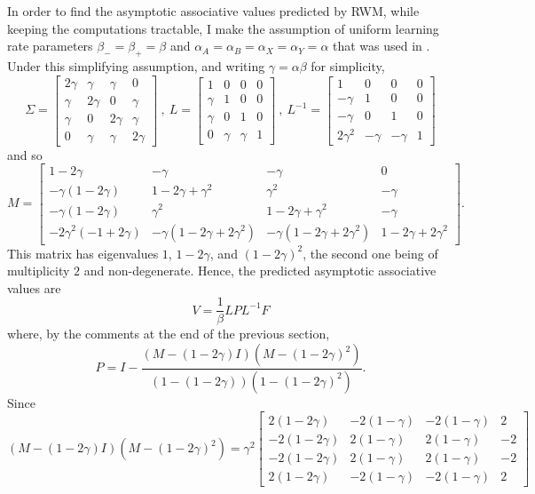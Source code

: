 \documentclass[]{interact}
\theoremstyle{plain}%
\theoremstyle{definition}
\theoremstyle{remark}
\begin{document}
In order to find the asymptotic associative values predicted by RWM, while keeping the computations tractable, I make the assumption of uniform learning rate parameters $\beta_-=\beta_+=\beta$ and $\alpha_A=\alpha_B=\alpha_X=\alpha_Y=\alpha$ that was used in \cite{A24}.
Under this simplifying assumption, and writing $\gamma=\alpha\beta$ for simplicity,
\[
\Sigma=
\begin{bmatrix}
2\gamma & \gamma		& \gamma 			& 0\\
\gamma	& 2\gamma & 0					 & \gamma\\
\gamma	& 0 			& 2\gamma & \gamma\\
0			& \gamma				& \gamma		& 2\gamma
\end{bmatrix} \ , \ 
L=\begin{bmatrix}
1 & 0 & 0 & 0 \\
\gamma& 1 & 0					 & 0\\
\gamma		& 0 			& 1 & 0\\
0			& \gamma				& \gamma			& 1
\end{bmatrix} \ , \
L^{-1}=\begin{bmatrix}
1 & 0 & 0 & 0 \\
-\gamma		& 1 & 0					 & 0\\
-\gamma			& 0 			& 1 & 0\\
2\gamma^2		& -\gamma				& -\gamma			& 1
\end{bmatrix}
\]
and so
\[
M=\begin{bmatrix}
1-2\gamma & -\gamma & - \gamma & 0\\
-\gamma(1-2\gamma) & 1-2\gamma+\gamma^2 & \gamma^2 & -\gamma\\
-\gamma(1-2\gamma) &\gamma^2 & 1-2\gamma+\gamma^2 & - \gamma\\
-2\gamma^2(-1+2\gamma)&-\gamma(1-2\gamma+2\gamma^2)&-\gamma(1-2\gamma+2\gamma^2)&1-2\gamma+2\gamma^2
\end{bmatrix}.
\]
This matrix has eigenvalues $1$, $1-2\gamma$, and $(1-2\gamma)^2$, the second one being of multiplicity $2$ and non-degenerate. Hence, the predicted asymptotic associative values are
\[
V=\frac{1}{\beta}L P L^{-1}F
\]
where, by the comments at the end of the previous section,
\[
P=I-\frac{(M-(1-2\gamma)I)(M-(1-2\gamma)^2)}{(1-(1-2\gamma))(1-(1-2\gamma)^2)}.
\]
Since 
\[
(M-(1-2\gamma)I)(M-(1-2\gamma)^2)=\gamma^2\begin{bmatrix}
2(1-2\gamma)& -2(1-\gamma) & -2(1-\gamma) & 2\\
-2(1-2\gamma)& 2(1-\gamma) & 2(1-\gamma) & -2\\
-2(1-2\gamma)& 2(1-\gamma) & 2(1-\gamma) & -2\\
2(1-2\gamma)& -2(1-\gamma) & -2(1-\gamma) & 2
\end{bmatrix}
\]
\end{document}
